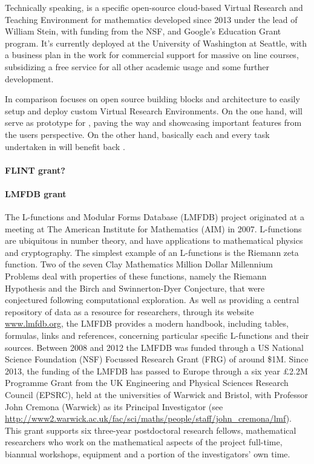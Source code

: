 Technically speaking, \SMC is a specific open-source cloud-based
Virtual Research and Teaching Environment for mathematics developed
since 2013 under the lead of William Stein, with funding from the NSF,
and Google's Education Grant program. It's currently deployed at the
University of Washington at Seattle, with a business plan in the work
for commercial support for massive on line courses, subsidizing a free
service for all other academic usage and some further \Sage
development.

In comparison \TheProject focuses on open source building blocks and
architecture to easily setup and deploy custom Virtual Research
Environments. On the one hand, \SMC will serve as prototype for
\TheProject, paving the way and showcasing important features from the
users perspective. On the other hand, basically each and every task
undertaken in \TheProject will benefit back \SMC.

\paragraph{FLINT grant?}

\paragraph{LMFDB grant}

The L-functions and Modular Forms Database (LMFDB) project originated
at a meeting at The American Institute for Mathematics (AIM) in 2007.
L-functions are ubiquitous in number theory, and have applications to
mathematical physics and cryptography. The simplest example of an
L-functions is the Riemann zeta function. Two of the seven Clay
Mathematics Million Dollar Millennium Problems deal with properties of
these functions, namely the Riemann Hypothesis and the Birch and
Swinnerton-Dyer Conjecture, that were conjectured following computational exploration.  
As well as providing a central repository
of data as a resource for researchers, through its website
\url{www.lmfdb.org}, the LMFDB provides a modern handbook, including
tables, formulas, links and references, concerning particular specific
L-functions and their sources.  Between 2008 and 2012 the LMFDB was
funded through a US National Science Foundation (NSF) Focussed
Research Grant (FRG) of around \$1M.  Since 2013, the funding of the
LMFDB has passed to Europe through a six year £2.2M Programme Grant
from the UK Engineering and Physical Sciences Research Council
(EPSRC), held at the universities of Warwick and Bristol, with
Professor John Cremona (Warwick) as its Principal Investigator (see
\url{http://www2.warwick.ac.uk/fac/sci/maths/people/staff/john_cremona/lmf}).
This grant supports six three-year postdoctoral research fellows,
mathematical researchers who work on the mathematical aspects of the
project full-time, biannual workshops, equipment and a portion of the
investigators' own time.

